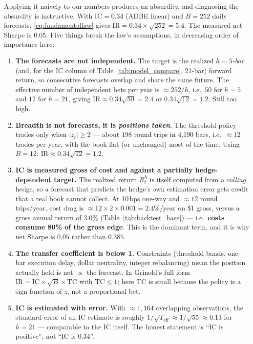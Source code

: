 Applying it naively to our numbers produces an absurdity, and diagnosing the absurdity is
instructive. With $\mathrm{IC}=0.34$ (ADBE linear) and $B=252$ daily forecasts,
\eqref{eq:fundamentallaw} gives $\mathrm{IR}=0.34\times\sqrt{252}=5.4$. The measured net
Sharpe is $0.05$. Five things break the law's assumptions, in decreasing order of
importance here:
\begin{enumerate}
  \item \textbf{The forecasts are not independent.} The target is the realized
    \emph{$h=5$-bar} (and, for the IC column of Table~\ref{tab:model_compare}, 21-bar)
    forward return, so consecutive forecasts overlap and share the same future. The
    effective number of independent bets per year is $\approx252/h$, i.e.\ $50$ for
    $h=5$ and $12$ for $h=21$, giving $\mathrm{IR}\approx0.34\sqrt{50}=2.4$ or
    $0.34\sqrt{12}=1.2$. Still too high.
  \item \textbf{Breadth is not forecasts, it is \emph{positions taken}.} The threshold
    policy trades only when $\lvert z_t\rvert\ge2$ --- about $198$ round trips in
    4{,}190 bars, i.e.\ $\approx12$ trades per year, with the book flat (or unchanged)
    most of the time. Using $B=12$: $\mathrm{IR}\approx0.34\sqrt{12}=1.2$.
  \item \textbf{IC is measured gross of cost and against a partially hedge-dependent
    target.} The realized return $R_t^h$ is itself computed from a \emph{rolling} hedge,
    so a forecast that predicts the hedge's own estimation error gets credit that a real
    book cannot collect. At 10\,bps one-way and $\approx12$ round trips/year, cost drag is
    $\approx12\times2\times0.001=2.4\%$/year on \$1 gross, versus a gross annual return of
    $3.0\%$ (Table~\ref{tab:backtest_base}) --- i.e.\ \textbf{costs consume 80\% of the
    gross edge}. This is the dominant term, and it is why net Sharpe is $0.05$ rather than
    $0.385$.
  \item \textbf{The transfer coefficient is below 1.} Constraints (threshold bands,
    one-bar execution delay, dollar neutrality, integer rebalancing) mean the position
    actually held is not $\propto$ the forecast. In Grinold's full form
    $\mathrm{IR}=\mathrm{IC}\times\sqrt{B}\times\mathrm{TC}$ with $\mathrm{TC}\le1$;
    here $\mathrm{TC}$ is small because the policy is a sign function of $z$, not a
    proportional bet.
  \item \textbf{IC is estimated with error.} With $\approx1{,}164$ overlapping
    observations, the standard error of an IC estimate is roughly
    $1/\sqrt{T_{\text{eff}}}\approx1/\sqrt{55}\approx0.13$ for $h=21$ --- comparable to
    the IC itself. The honest statement is ``IC is positive'', not ``IC is $0.34$''.
\end{enumerate}

